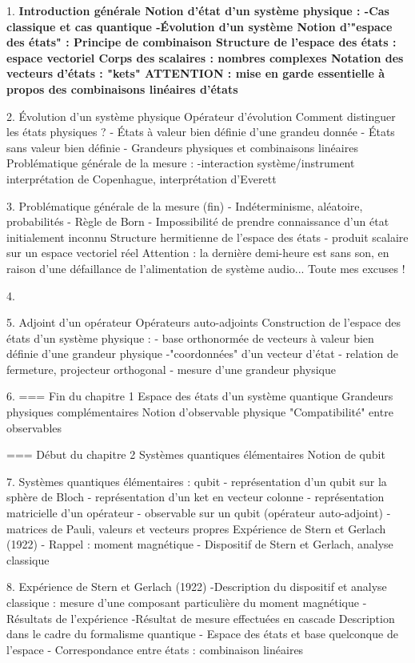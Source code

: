 1.
\bf{Introduction générale}
\bf{Notion d'état d'un système physique :}
-Cas classique et cas quantique
-Évolution d'un système
\bf{Notion d'"espace des états" :}
Principe de combinaison
Structure de l'espace des états : espace vectoriel
Corps des scalaires : nombres complexes
\bf{Notation des vecteurs d'états : "kets"}
\bf{ATTENTION :} mise en garde essentielle à propos des combinaisons linéaires d'états

2.
Évolution d'un système physique
Opérateur d'évolution
Comment distinguer les états physiques ?
- États à valeur bien définie d'une grandeu donnée
- États sans valeur bien définie
- Grandeurs physiques et combinaisons linéaires
Problématique générale de la mesure :
-interaction système/instrument
interprétation de Copenhague, interprétation d'Everett

3.
Problématique générale de la mesure (fin)
- Indéterminisme, aléatoire, probabilités
- Règle de Born
- Impossibilité de prendre connaissance d'un état initialement inconnu
Structure hermitienne de l'espace des états
- produit scalaire sur un espace vectoriel réel
Attention : la dernière demi-heure est sans son, en raison d'une défaillance de l'alimentation de système audio... Toute mes excuses !

4.
\bf{}
\bf{}
\bf{}

5.
Adjoint d'un opérateur
Opérateurs auto-adjoints
Construction de l'espace des états d'un système physique :
- base orthonormée de vecteurs à valeur bien définie d'une grandeur physique
-"coordonnées" d'un vecteur d'état
- relation de fermeture, projecteur orthogonal
- mesure d'une grandeur physique

6.
=== Fin du chapitre 1
Espace des états d'un système quantique
Grandeurs physiques complémentaires
Notion d'observable physique
"Compatibilité" entre observables

=== Début du chapitre 2
Systèmes quantiques élémentaires
Notion de qubit

7.
Systèmes quantiques élémentaires : qubit
- représentation d'un qubit sur la sphère de Bloch
- représentation d'un ket en vecteur colonne
- représentation matricielle d'un opérateur
- observable sur un qubit (opérateur auto-adjoint)
- matrices de Pauli, valeurs et vecteurs propres
Expérience de Stern et Gerlach (1922)
- Rappel : moment magnétique
- Dispositif de Stern et Gerlach, analyse classique

8.
Expérience de Stern et Gerlach (1922)
-Description du dispositif et analyse classique : mesure d'une composant particulière du moment magnétique
-Résultats de l'expérience
-Résultat de mesure effectuées en cascade
Description dans le cadre du formalisme quantique
- Espace des états et base quelconque de l'espace
- Correspondance entre états : combinaison linéaires

